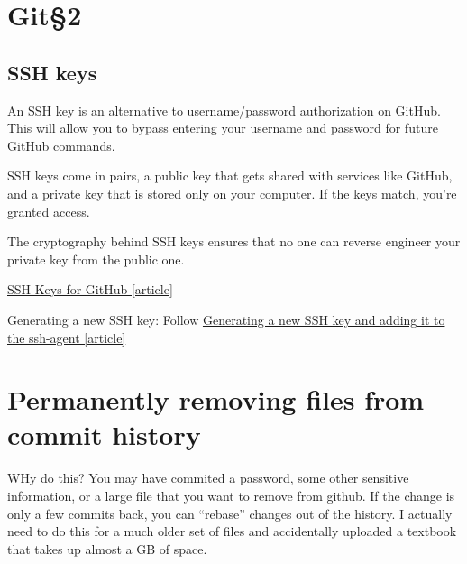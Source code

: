 \section{Git\S 2}

\subsection{SSH keys}

An SSH key is an alternative to username/password authorization on GitHub. This will allow you to bypass entering your username and password for future GitHub commands.


SSH keys come in pairs, a public key that gets shared with services like GitHub, and a private key that is stored only on your computer. If the keys match, you're granted access.

The cryptography behind SSH keys ensures that no one can reverse engineer your private key from the public one.

\href{https://jdblischak.github.io/2014-09-18-chicago/novice/git/05-sshkeys.html}{SSH Keys for GitHub [article]}

Generating a new SSH key: Follow \href{https://docs.github.com/en/free-pro-team@latest/github/authenticating-to-github/generating-a-new-ssh-key-and-adding-it-to-the-ssh-agent}{Generating a new SSH key and adding it to the ssh-agent [article]}


\section{Permanently removing files from commit history}

WHy do this? You may have commited a password, some other sensitive information, or a large file that you want to remove from github. If the change is only a few commits back, you can 	``rebase'' changes out of the history. I actually need to do this for a much older set of files and accidentally uploaded a textbook that takes up almost a GB of space. 



